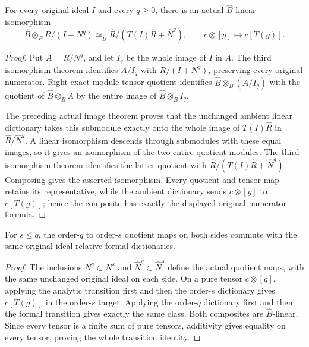 \begin{theorem}
\label{hir:actual-relative-formal-original-ideal-quotient}
\leanok
For every original ideal $I$ and every $q\ge0$, there is an actual
$\widehat B$-linear isomorphism
\[
 \widehat B\otimes_B R/(I+N^q)\simeq_{\widehat B}
 \widehat R/(T(I)\widehat R+\widehat N^q),
 \qquad c\otimes[g]\longmapsto c[T(g)].
\]
\end{theorem}
\begin{proof}
Put $A=R/N^q$, and let $I_q$ be the whole image of $I$ in $A$.
The third isomorphism theorem identifies $A/I_q$ with
$R/(I+N^q)$, preserving every original numerator. Right exact
module tensor quotient identifies $\widehat B\otimes_B(A/I_q)$
with the quotient of $\widehat B\otimes_B A$ by the entire image
of $\widehat B\otimes_B I_q$.

The preceding actual image theorem proves that the unchanged ambient
linear dictionary takes this submodule exactly onto the whole image
of $T(I)\widehat R$ in $\widehat R/\widehat N^q$. A linear
isomorphism descends through submodules with these equal images,
so it gives an isomorphism of the two entire quotient modules.
The third isomorphism theorem identifies the latter quotient with
$\widehat R/(T(I)\widehat R+\widehat N^q)$.
Composing gives the asserted isomorphism. Every quotient and tensor
map retains its representative, while the ambient dictionary sends
$c\otimes[g]$ to $c[T(g)]$; hence the composite has exactly the
displayed original-numerator formula.
\end{proof}

\begin{theorem}
\label{hir:actual-relative-formal-normal-transitions}
\leanok
For $s\le q$, the order-$q$ to order-$s$ quotient maps on both sides
commute with the same original-ideal relative formal dictionaries.
\end{theorem}
\begin{proof}
The inclusions $N^q\subset N^s$ and
$\widehat N^q\subset\widehat N^s$ define the actual quotient maps,
with the same unchanged original ideal on each side. On a pure
tensor $c\otimes[g]$, applying the analytic transition first and
then the order-$s$ dictionary gives $c[T(g)]$ in the order-$s$
target. Applying the order-$q$ dictionary first and then the formal
transition gives exactly the same class. Both composites are
$\widehat B$-linear. Since every tensor is a finite sum of pure
tensors, additivity gives equality on every tensor, proving the
whole transition identity.
\end{proof}


